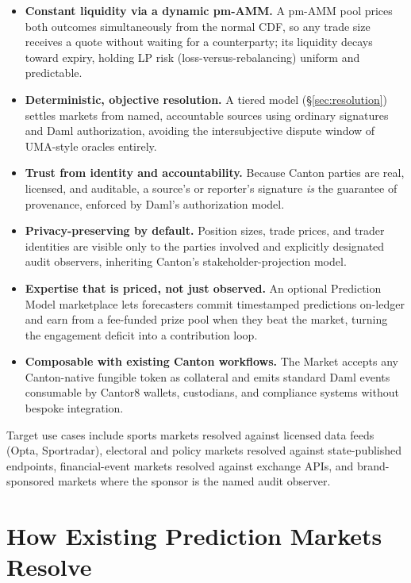 \documentclass[11pt,a4paper]{article}
\begin{document}
\begin{itemize}[leftmargin=2em, itemsep=2pt]
  \item \textbf{Constant liquidity via a dynamic pm-AMM.} A pm-AMM pool prices both outcomes simultaneously from the normal CDF, so any trade size receives a quote without waiting for a counterparty; its liquidity decays toward expiry, holding LP risk (loss-versus-rebalancing) uniform and predictable.
  \item \textbf{Deterministic, objective resolution.} A tiered model (\S\ref{sec:resolution}) settles markets from named, accountable sources using ordinary signatures and Daml authorization, avoiding the intersubjective dispute window of UMA-style oracles entirely.
  \item \textbf{Trust from identity and accountability.} Because Canton parties are real, licensed, and auditable, a source's or reporter's signature \emph{is} the guarantee of provenance, enforced by Daml's authorization model.
  \item \textbf{Privacy-preserving by default.} Position sizes, trade prices, and trader identities are visible only to the parties involved and explicitly designated audit observers, inheriting Canton's stakeholder-projection model.
  \item \textbf{Expertise that is priced, not just observed.} An optional Prediction Model marketplace lets forecasters commit timestamped predictions on-ledger and earn from a fee-funded prize pool when they beat the market, turning the engagement deficit into a contribution loop.
  \item \textbf{Composable with existing Canton workflows.} The Market accepts any Canton-native fungible token as collateral and emits standard Daml events consumable by Cantor8 wallets, custodians, and compliance systems without bespoke integration.
\end{itemize}

Target use cases include sports markets resolved against licensed data feeds (Opta, Sportradar), electoral and policy markets resolved against state-published endpoints, financial-event markets resolved against exchange APIs, and brand-sponsored markets where the sponsor is the named audit observer.

\section{How Existing Prediction Markets Resolve}
\label{sec:related}
\end{document}
